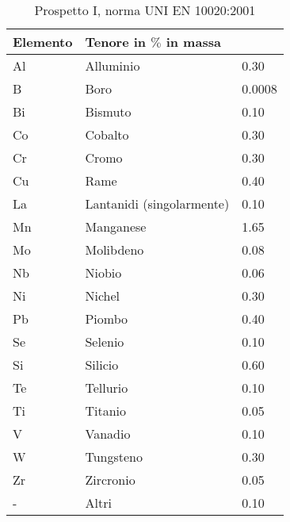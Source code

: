 \begin{table}
\centering
\caption{Prospetto I, norma UNI EN 10020:2001}\label{tab:Prosp1}
\begin{tabularx}{0.5\textwidth}{lXl}
\toprule
\textbf{Elemento} &\textbf{Tenore in $\%$ in massa}\\
\midrule
Al & Alluminio & 0.30\\
B & Boro & 0.0008\\
Bi & Bismuto & 0.10\\
Co & Cobalto & 0.30\\
Cr & Cromo & 0.30\\
Cu & Rame & 0.40\\
La & Lantanidi (singolarmente) & 0.10\\
Mn & Manganese & 1.65\\
Mo & Molibdeno & 0.08\\
Nb & Niobio & 0.06\\
Ni & Nichel & 0.30\\
Pb & Piombo & 0.40\\
Se & Selenio & 0.10\\
Si & Silicio & 0.60\\
Te & Tellurio & 0.10\\
Ti & Titanio & 0.05\\
V & Vanadio & 0.10\\
W & Tungsteno & 0.30\\
Zr & Zircronio & 0.05\\
- & Altri & 0.10\\
\bottomrule
\end{tabularx}
\end{table}

